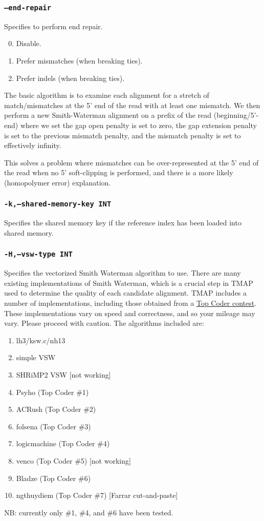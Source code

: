 \documentclass[a4paper,12pt]{book}
\newcommand{\TT}[1]{{\tt #1}} %
\begin{document}
\subsubsection{\TT{--end-repair}}
Specifies to perform end repair.
\begin{enumerate}
	\setcounter{enumi}{-1} %
	\item Disable.
	\item Prefer mismatches (when breaking ties).
	\item Prefer indels (when breaking ties).
\end{enumerate}
The basic algorithm is to examine each alignment for a stretch of match/mismatches at the 5' end of the read with at least one mismatch.
We then perform a new Smith-Waterman alignment on a prefix of the read (beginning/5'-end) where we set the gap open penalty is set to zero, the gap extension penalty is set to the previous mismatch penalty, and the mismatch penalty is set to effectively infinity.

This solves a problem where mismatches can be over-represented at the 5' end of the read when no 5' soft-clipping is performed, and there is a more likely (homopolymer error) explanation.

\subsubsection{\TT{-k,--shared-memory-key INT}}
Specifies the shared memory key if the reference index has been loaded into shared memory.

\subsubsection{\TT{-H,--vsw-type INT}}
Specifies the vectorized Smith Waterman algorithm to use.
There are many existing implementations of Smith Waterman, which is a crucial step in TMAP used to determine the quality of each candidate alignment.
TMAP includes a number of implementations, including those obtained from a  \href{http://community.topcoder.com/longcontest/?module=ViewProblemStatement&rd=15078&pm=11786}{Top Coder contest}.
These implementations vary on speed and correctness, and so your mileage may vary.  
Please proceed with caution. 
The algorithms included are:
\begin{enumerate}
\item lh3/ksw.c/nh13
\item simple VSW
\item SHRiMP2 VSW [not working]
\item Psyho (Top Coder \#1)
\item ACRush (Top Coder \#2)
\item folsena (Top Coder \#3)
\item logicmachine (Top Coder \#4)
\item venco (Top Coder \#5) [not working]
\item Bladze (Top Coder \#6)
\item ngthuydiem (Top Coder \#7) [Farrar cut-and-paste]
\end{enumerate}
NB: currently only \#1, \#4, and \#6 have been tested.
\end{document}
